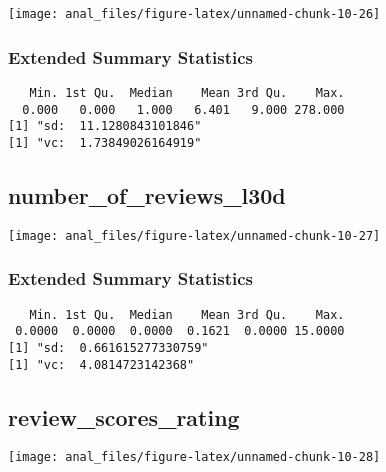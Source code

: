 \begin{center}\texttt{[image: anal\_files/figure-latex/unnamed-chunk-10-26]} \end{center}

\hypertarget{extended-summary-statistics-12}{%
\subsubsection{Extended Summary
Statistics}\label{extended-summary-statistics-12}}

\begin{verbatim}   Min. 1st Qu.  Median    Mean 3rd Qu.    Max. 
  0.000   0.000   1.000   6.401   9.000 278.000 
[1] "sd:  11.1280843101846"
[1] "vc:  1.73849026164919"
\end{verbatim}

\pagebreak

\hypertarget{number_of_reviews_l30d}{%
\subsection{number\_of\_reviews\_l30d}\label{number_of_reviews_l30d}}

\begin{center}\texttt{[image: anal\_files/figure-latex/unnamed-chunk-10-27]} \end{center}

\hypertarget{extended-summary-statistics-13}{%
\subsubsection{Extended Summary
Statistics}\label{extended-summary-statistics-13}}

\begin{verbatim}   Min. 1st Qu.  Median    Mean 3rd Qu.    Max. 
 0.0000  0.0000  0.0000  0.1621  0.0000 15.0000 
[1] "sd:  0.661615277330759"
[1] "vc:  4.0814723142368"
\end{verbatim}

\pagebreak

\hypertarget{review_scores_rating}{%
\subsection{review\_scores\_rating}\label{review_scores_rating}}

\begin{center}\texttt{[image: anal\_files/figure-latex/unnamed-chunk-10-28]} \end{center}

